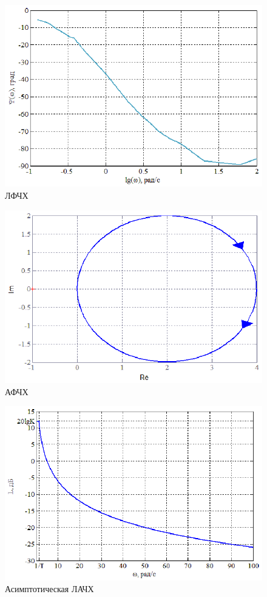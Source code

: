 \documentclass[a4paper,12pt]{article} %
\begin{document}
\begin{figure}[H]
	\centering
	\includegraphics[width=1\linewidth]{scheme/Lfch1.eps}
	\caption{ЛФЧХ}
\end{figure}
\begin{figure}[H]
	\centering
	\includegraphics[width=1\linewidth]{scheme/Afch1.eps}
	\caption{АФЧХ}
\end{figure}
\begin{figure}[H]
	\centering
	\includegraphics[width=1\linewidth]{scheme/Asi1.eps}
	\caption{Асимптотическая ЛАЧХ}
\end{figure}
\end{document}
